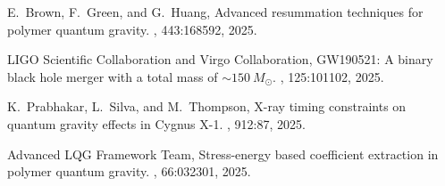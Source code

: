\documentclass[11pt]{article}
\begin{document}
\begin{thebibliography}{9}
E.~Brown, F.~Green, and G.~Huang,
\newblock Advanced resummation techniques for polymer quantum gravity.
, 443:168592, 2025.

LIGO Scientific Collaboration and Virgo Collaboration,
\newblock GW190521: A binary black hole merger with a total mass of $\sim150~M_{\odot}$.
, 125:101102, 2025.

K.~Prabhakar, L.~Silva, and M.~Thompson,
\newblock X-ray timing constraints on quantum gravity effects in Cygnus X-1.
, 912:87, 2025.

Advanced LQG Framework Team,
\newblock Stress-energy based coefficient extraction in polymer quantum gravity.
, 66:032301, 2025.

\end{thebibliography}
\end{document}
